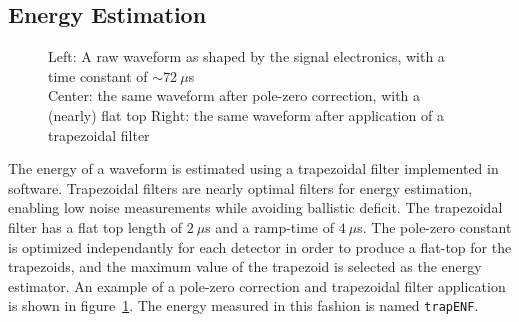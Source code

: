 \documentclass[/main.tex]{subfiles}
\begin{document}
\subsection{Energy Estimation}
\begin{figure}
  \centering
  \caption[Pole-zero correction and trapezoidal filter]{\label{fig:trapfilter}
    Left: A raw waveform as shaped by the signal electronics, with a time constant of $\sim72~\mu$s\\
    Center: the same waveform after pole-zero correction, with a (nearly) flat top
    Right: the same waveform after application of a trapezoidal filter
  }
\end{figure}
The energy of a waveform is estimated using a trapezoidal filter implemented in software.
Trapezoidal filters are nearly optimal filters for energy estimation, enabling low noise measurements while avoiding ballistic deficit\cite{Radeka1972, knoll}.
The trapezoidal filter has a flat top length of $2~\mu$s and a ramp-time of $4~\mu$s.
The pole-zero constant is optimized independantly for each detector in order to produce a flat-top for the trapezoids, and the maximum value of the trapezoid is selected as the energy estimator.
An example of a pole-zero correction and trapezoidal filter application is shown in figure~\ref{fig:trapfilter}.
The energy measured in this fashion is named \texttt{trapENF}.
\\
\end{document}
